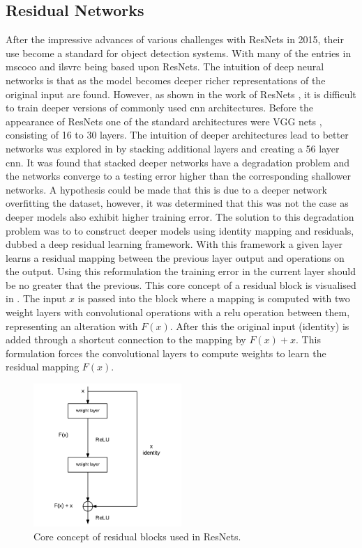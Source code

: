 \subsection{Residual Networks}
After the impressive advances of various challenges with ResNets in 2015, their use become a standard for object detection systems. With many of the entries in \gls{mscoco} and \gls{ilsvrc} being based upon ResNets. The intuition of deep neural networks is that as the model becomes deeper richer representations of the original input are found. However, as shown in the work of ResNets \cite{deepres}, it is difficult to train deeper versions of commonly used \gls{cnn} architectures. Before the appearance of ResNets one of the standard architectures were VGG nets \cite{vgg16}, consisting of 16 to 30 layers. The intuition of deeper architectures lead to better networks was explored in \cite{deepres} by stacking additional layers and creating a 56 layer \gls{cnn}. It was found that stacked deeper networks have a degradation problem and the networks converge to a testing error higher than the corresponding shallower networks. A hypothesis could be made that this is due to a deeper network overfitting the dataset, however, it was determined that this was not the case as deeper models also exhibit higher training error. The solution to this degradation problem was to to construct deeper models using identity mapping and residuals, dubbed a deep residual learning framework. With this framework a given layer learns a residual mapping between the previous layer output and operations on the output. Using this reformulation the training error in the current layer should be no greater that the previous. This core concept of a residual block is visualised in . The input $x$ is passed into the block where a mapping is computed with two weight layers with convolutional operations with a \gls{relu} operation between them, representing an alteration with $F(x)$. After this the original input (identity) is added through a shortcut connection to the mapping by $F(x) + x$. This formulation forces the convolutional layers to compute weights to learn the residual mapping $F(x)$. 

\begin{figure}[H]
  \centering
    \includegraphics[width=0.5\textwidth]{Figs/Techanal/resblock.pdf}
    \caption{Core concept of residual blocks used in ResNets.}
    \label{fig:resblock}
\end{figure}

